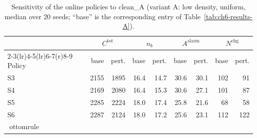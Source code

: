 \begin{table}[htbp]
\centering
\caption{Sensitivity of the online policies to clean_A (variant A: low density, uniform,
median over 20 seeds; ``base'' is the corresponding entry of
Table~\ref{tab:ch6-results-A}).}
\label{tab:ch6-sens-A-clean}
\footnotesize
\begin{tabular}{@{}l rr rr rr rr@{}}
\toprule
& \multicolumn{2}{c}{$C^{\mathrm{tot}}$} & \multicolumn{2}{c}{$n_b$}
  & \multicolumn{2}{c}{$A^{\mathrm{alarm}}$} & \multicolumn{2}{c}{$N^{\mathrm{chg}}$} \\
\cmidrule(r){2-3}\cmidrule(lr){4-5}\cmidrule(lr){6-7}\cmidrule(r){8-9}
Policy & base & pert. & base & pert. & base & pert. & base & pert. \\
\midrule

S3 & 2155 & 1895 & 16.4 & 14.7 & 30.6 & 30.1 & 102 & 91 \\
S4 & 2169 & 2080 & 16.4 & 15.3 & 30.6 & 27.1 & 101 & 87 \\
S5 & 2285 & 2224 & 18.0 & 17.4 & 25.8 & 21.6 & 68 & 58 \\
S6 & 2287 & 2124 & 18.0 & 17.2 & 25.6 & 23.1 & 112 & 122 \\
ottomrule
\end{tabular}
\end{table}
